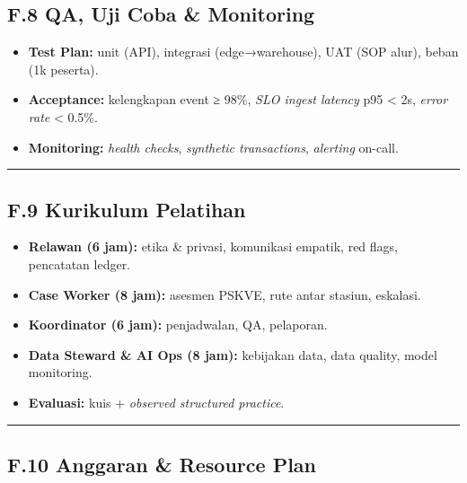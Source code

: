 \documentclass[
  letterpaper,
  DIV=11,
  numbers=noendperiod]{scrartcl}
\providecommand{\tightlist}{%
  \setlength{\itemsep}{0pt}\setlength{\parskip}{0pt}}
\begin{document}
\subsection{F.8 QA, Uji Coba \&
Monitoring}\label{f.8-qa-uji-coba-monitoring}

\begin{itemize}
\tightlist
\item
  \textbf{Test Plan:} unit (API), integrasi (edge→warehouse), UAT (SOP
  alur), beban (1k peserta).
\item
  \textbf{Acceptance:} kelengkapan event ≥ 98\%, \emph{SLO ingest
  latency} p95 \textless{} 2s, \emph{error rate} \textless{} 0.5\%.
\item
  \textbf{Monitoring:} \emph{health checks}, \emph{synthetic
  transactions}, \emph{alerting} on-call.
\end{itemize}

\begin{center}\rule{0.5\linewidth}{0.5pt}\end{center}

\subsection{F.9 Kurikulum Pelatihan}\label{f.9-kurikulum-pelatihan}

\begin{itemize}
\tightlist
\item
  \textbf{Relawan (6 jam):} etika \& privasi, komunikasi empatik, red
  flags, pencatatan ledger.
\item
  \textbf{Case Worker (8 jam):} asesmen PSKVE, rute antar stasiun,
  eskalasi.
\item
  \textbf{Koordinator (6 jam):} penjadwalan, QA, pelaporan.
\item
  \textbf{Data Steward \& AI Ops (8 jam):} kebijakan data, data quality,
  model monitoring.
\item
  \textbf{Evaluasi:} kuis + \emph{observed structured practice}.
\end{itemize}

\begin{center}\rule{0.5\linewidth}{0.5pt}\end{center}

\subsection{F.10 Anggaran \& Resource
Plan}\label{f.10-anggaran-resource-plan}
\end{document}
